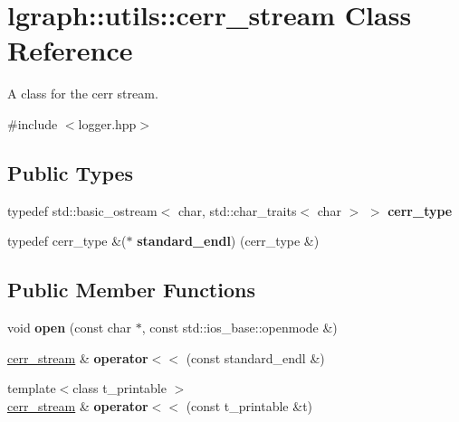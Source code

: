 \hypertarget{classlgraph_1_1utils_1_1cerr__stream}{}\section{lgraph\+:\+:utils\+:\+:cerr\+\_\+stream Class Reference}
\label{classlgraph_1_1utils_1_1cerr__stream}


A class for the cerr stream.  




{\ttfamily \#include $<$logger.\+hpp$>$}

\subsection*{Public Types}
\begin{DoxyCompactItemize}
\item 
typedef std\+::basic\+\_\+ostream$<$ char, std\+::char\+\_\+traits$<$ char $>$ $>$ {\bfseries cerr\+\_\+type}\hypertarget{classlgraph_1_1utils_1_1cerr__stream_a60b0847503d146249b71e70473740f57}{}\label{classlgraph_1_1utils_1_1cerr__stream_a60b0847503d146249b71e70473740f57}

\item 
typedef cerr\+\_\+type \&($\ast$ {\bfseries standard\+\_\+endl}) (cerr\+\_\+type \&)\hypertarget{classlgraph_1_1utils_1_1cerr__stream_a8b7e7603a4e656bd2d9196ae0f530c7b}{}\label{classlgraph_1_1utils_1_1cerr__stream_a8b7e7603a4e656bd2d9196ae0f530c7b}

\end{DoxyCompactItemize}
\subsection*{Public Member Functions}
\begin{DoxyCompactItemize}
\item 
void {\bfseries open} (const char $\ast$, const std\+::ios\+\_\+base\+::openmode \&)\hypertarget{classlgraph_1_1utils_1_1cerr__stream_aaec9df1b58756fcda596e29bbfcefeac}{}\label{classlgraph_1_1utils_1_1cerr__stream_aaec9df1b58756fcda596e29bbfcefeac}

\item 
\hyperlink{classlgraph_1_1utils_1_1cerr__stream}{cerr\+\_\+stream} \& {\bfseries operator$<$$<$} (const standard\+\_\+endl \&)\hypertarget{classlgraph_1_1utils_1_1cerr__stream_afd3014b9b67c23c7c86513c0f4969723}{}\label{classlgraph_1_1utils_1_1cerr__stream_afd3014b9b67c23c7c86513c0f4969723}

\item 
{\footnotesize template$<$class t\+\_\+printable $>$ }\\\hyperlink{classlgraph_1_1utils_1_1cerr__stream}{cerr\+\_\+stream} \& {\bfseries operator$<$$<$} (const t\+\_\+printable \&t)\hypertarget{classlgraph_1_1utils_1_1cerr__stream_afd9313105917714104d41bb3990ab81c}{}\label{classlgraph_1_1utils_1_1cerr__stream_afd9313105917714104d41bb3990ab81c}

\end{DoxyCompactItemize}


